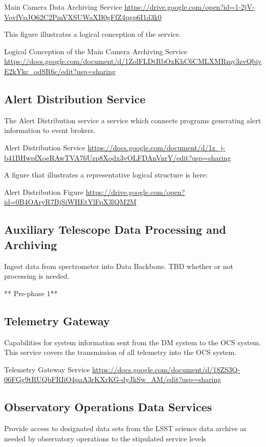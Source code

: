 Main Camera Data Archiving Service \url{https://drive.google.com/open?id=1-2jV-VovfVpJO62C2PmVXSUWaXB0gFfZ4pgp6I1d3k0}

This figure illustrates a logical conception of the service.

Logical Conception of the Main Camera Archiving Service  \url{https://docs.google.com/document/d/1ZolFLDtRbOxKhC6CMLXMRmy3zvQbiyE2kYkc_odSR6c/edit?usp=sharing}


\subsection{Alert Distribution Service}

The Alert Distribution service a service which connects programs
generating alert information to event brokers.

Alert Distribution Service \url{https://docs.google.com/document/d/1z_j-b41BHwpfXoeRAwTVA76Uzp8Xodx3vOLFDAnVnrY/edit?usp=sharing}

A figure that illustrates a representative logical structure is here:

Alert Distribution Figure \url{https://drive.google.com/open?id=0B4OAryR7BjSiWHEtYlFpX3lQM2M}

\subsection{Auxiliary Telescope  Data Processing and Archiving}

Ingest data from spectrometer into Data Backbone.
TBD whether or not processing is needed.

** Pre-phase 1**

\subsection{Telemetry Gateway}

Capabilities for system information sent from the DM system to the OCS system.
This service covers the transmission of all telemetry into the OCS system.

Telemetry Gateway Service \url{https://docs.google.com/document/d/18ZS3Q-06FGg9tRUQbFRIiO4paA3rKXrKG-dyJkSw_AM/edit?usp=sharing}

\subsection{Observatory Operations Data Services}
Provide access to designated data sets from the LSST science data archive as needed by observatory operations to the stipulated service levels

